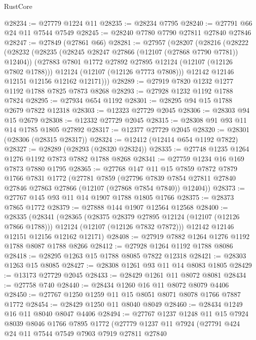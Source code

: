\begin{lexlean}{RustCore}
\begin{coremodule}
@28234 := @27779 @1224 @11
@28235 := @28234 @7795
@28240 := @27791 @66 @24 @11 @7544 @7549
@28245 := @28240 @7780 @7790 @27811 @27840 @27846
@28247 := @27849 (@27861 @66)
@28281 := @27957
    (@28207
      (@28216
        (@28222
          (@28232
            (@28235 (@28245 @28247 @27866 (@12107 (@27868 @7790 @7781)) @12404))
            (@27883 @7801 @1772 @27892 @27895 @12124 (@12107 (@12126 @7802 @1788)))
            @12124
            (@12107 (@12126 @7773 @7808)))
          @12142
          @12146
          @12151
          @12156
          @12162
          @12171)))
@28289 := @27919 @7820 @1232 @1277 @1192 @1788 @7825 @7873 @8268
@28293 := @27928 @1232 @1192 @1788 @7824
@28295 := @27934 @654 @1192
@28301 := @28295 @94 @15 @1788 @2679 @7822 @12318
@28303 := @12323 @27729 @2045
@28306 := @28303 @94 @15 @2679
@28308 := @12332 @27729 @2045
@28315 := @28308 @91 @93 @11 @14 @1785 @1805 @27892
@28317 := @12377 @27729 @2045
@28320 := @28301 (@28306 (@28315 @28317))
@28324 := @12412 (@12414 @654 @1192 @7822)
@28327 := @28289 (@28293 (@28320 @28324))
@28335 := @27748 @1235 @1264 @1276 @1192 @7873 @7882 @1788 @8268
@28341 := @27759 @1234 @16 @169 @7873 @7880 @1795
@28365 := @27768
    @147
    @11
    @15
    @7859
    @7872
    @7879
    @1766
    @7831
    @1772
    (@27781
      @7859
      (@27796 @7839 @7854 @27811 @27840 @27846 @27863 @27866 (@12107 (@27868 @7854 @7840)) @12404))
@28373 := @27767 @145 @93 @11 @14 @1907 @1788 @1805 @1766
@28375 := @28373 @7865 @1772
@28379 := @27888 @144 @1907 @12564 @12568
@28400 := @28335
    (@28341
      (@28365
        (@28375 @28379 @27895 @12124 (@12107 (@12126 @7866 @1788)))
        @12124
        (@12107 (@12126 @7832 @7872)))
      @12142
      @12146
      @12151
      @12156
      @12162
      @12171)
@28408 := @27919 @7882 @1264 @1276 @1192 @1788 @8087 @1788 @8266
@28412 := @27928 @1264 @1192 @1788 @8086
@28418 := @28295 @1263 @15 @1788 @8085 @7822 @12318
@28421 := @28303 @1263 @15 @8085
@28427 := @28308 @1261 @93 @11 @14 @8083 @1805
@28429 := @13173 @27729 @2045
@28433 := @28429 @1261 @11 @8072 @8081
@28434 := @27758 @740
@28440 := @28434 @1260 @16 @11 @8072 @8079 @4406
@28450 := @27767 @1250 @1259 @11 @15 @8051 @8071 @8078 @1766 @7887 @1772
@28454 := @28429 @1250 @11 @8040 @8049
@28460 := @28434 @1249 @16 @11 @8040 @8047 @4406
@28494 := @27767
    @1237
    @1248
    @11
    @15
    @7924
    @8039
    @8046
    @1766
    @7895
    @1772
    (@27779
      @1237
      @11
      @7924
      (@27791
        @424
        @24
        @11
        @7544
        @7549
        @7903
        @7919
        @27811
        @27840

\end{coremodule}
\end{lexlean}
